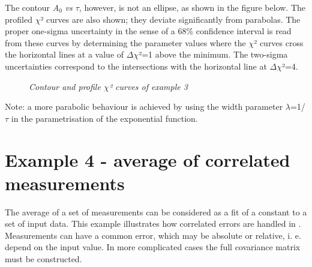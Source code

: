 \documentclass[a4paper,10pt,english]{sphinxmanual}
\begin{document}
The contour \emph{A}$_{\text{0}}$ \emph{vs \(\tau\)}, however, is not an ellipse,
as shown in the figure below. The profiled \(\chi\)² curves are
also shown; they deviate significantly from parabolas.
The proper one-sigma uncertainty in the sense of a 68\%
confidence interval is read from these curves by determining
the parameter values where the \(\chi\)² curves cross the horizontal
lines at a value of \(\Delta\)\(\chi\)²=1 above the minimum. The two-sigma
uncertainties correspond to the intersections with the
horizontal line at \(\Delta\)\(\chi\)²=4.
\begin{figure}[htbp]
\centering
\capstart

\caption{\emph{Contour and profile \(\chi\)² curves of example 3}}\end{figure}

Note: a more parabolic behaviour is achieved
by using the width parameter \(\lambda\)=1/\(\tau\) in the
parametrisation of the exponential function.


\section{Example 4 - average of correlated measurements}
\label{index:example-4-average-of-correlated-measurements}
The average of a set of measurements can be considered as a fit
of a constant to a set of input data. This example illustrates
how correlated errors are handled in .
Measurements can have a common error, which may be absolute
or relative, i. e. depend on the input value.  In more complicated
cases the full covariance matrix must be constructed.
\end{document}

